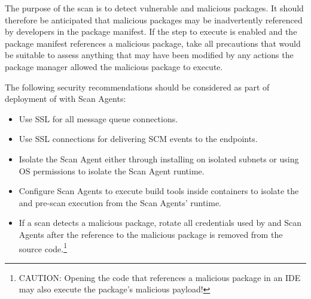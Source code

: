 The purpose of the \scaresolver scan is to detect vulnerable and malicious packages. It
should therefore be anticipated that malicious packages may be inadvertently referenced
by developers in the package manifest.  If the step to execute \scaresolver is enabled
and the package manifest references a malicious package, take all precautions that
would be suitable to assess anything that may have been modified by any actions the package
manager allowed the malicious package to execute.

The following security recommendations should be considered as part of deployment of \cxoneflow with Scan Agents:
\begin{itemize}
  \item Use SSL for all message queue connections.
  \item Use SSL connections for delivering SCM events to the \cxoneflow endpoints.
  \item Isolate the Scan Agent either through installing on isolated subnets or using OS permissions to
  isolate the Scan Agent runtime.
  \item Configure Scan Agents to execute build tools inside containers to isolate the \scaresolver and pre-scan execution from
  the Scan Agents' runtime.
  \item If a scan detects a malicious package, rotate all credentials used by \cxoneflow and Scan Agents
  after the reference to the malicious package is removed from the source code.\footnote{CAUTION: Opening the code that
  references a malicious package in an IDE may also execute the package's malicious payload!}
\end{itemize}





